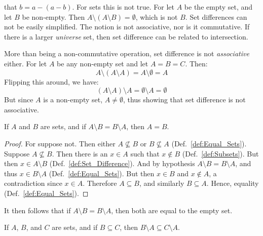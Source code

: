         that $b=a-(a-b)$. For sets this is not true. For let $A$ be the empty
        set, and let $B$ be non-empty. Then
        $A\setminus(A\setminus{B})=\emptyset$, which is not $B$. Set differences
        can not be easily simplified. The notion is not associative, nor is it
        commutative. If there is a larger \textit{universe} set, then set
        difference can be related to intersection.
        \begin{example}
            More than being a non-commutative operation, set difference is not
            \textit{associative} either. For let $A$ be any non-empty set and
            let $A=B=C$. Then:
            \begin{equation}
                A\setminus(A\setminus{A})=A\setminus\emptyset=A
            \end{equation}
            Flipping this around, we have:
            \begin{equation}
                (A\setminus{A})\setminus{A}=\emptyset\setminus{A}=\emptyset
            \end{equation}
            But since $A$ is a non-empty set, $A\ne\emptyset$, thus showing
            that set difference is not associative.
        \end{example}
        \begin{theorem}
            If $A$ and $B$ are sets, and if $A\setminus{B}=B\setminus{A}$, then
            $A=B$.
        \end{theorem}
        \begin{proof}
            For suppose not. Then either $A\nsubseteq{B}$ or $B\nsubseteq{A}$
            (Def.~\ref{def:Equal_Sets}). Suppose $A\nsubseteq{B}$. Then
            there is an $x\in{A}$ such that $x\notin{B}$
            (Def.~\ref{def:Subsets}). But then $x\in{A}\setminus{B}$
            (Def.~\ref{def:Set_Difference}). And by hypothesis
            $A\setminus{B}=B\setminus{A}$, and thus $x\in{B}\setminus{A}$
            (Def.~\ref{def:Equal_Sets}). But then $x\in{B}$ and $x\notin{A}$,
            a contradiction since $x\in{A}$. Therefore $A\subseteq{B}$, and
            similarly $B\subseteq{A}$. Hence, equality
            (Def.~\ref{def:Equal_Sets}).
        \end{proof}
        It then follows that if $A\setminus{B}=B\setminus{A}$, then both are
        equal to the empty set.
        \begin{theorem}
            \label{thm:Set_Difference_from_Superset}%
            If $A$, $B$, and $C$ are sets, and if $B\subseteq{C}$, then
            $B\setminus{A}\subseteq{C}\setminus{A}$.
        \end{theorem}

